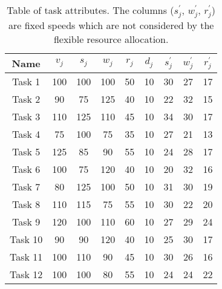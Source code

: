 \begin{table}[h]
    \begin{tabular}{|c|c|c|c|c|c|c|c|c|}
        \hline
        Name    & $v_j$ & $s_j$ & $w_j$ & $r_j$ & $d_j$ & $s^{'}_j$ & $w^{'}_j$ & $r^{'}_j$ \\ [0.5ex] \hline
        Task 1  & 100   & 100   & 100   & 50    & 10    & 30        & 27        & 17        \\ \hline
        Task 2  & 90    & 75    & 125   & 40    & 10    & 22        & 32        & 15        \\ \hline
        Task 3  & 110   & 125   & 110   & 45    & 10    & 34        & 30        & 17        \\ \hline
        Task 4  & 75    & 100   & 75    & 35    & 10    & 27        & 21        & 13        \\ \hline
        Task 5  & 125   & 85    & 90    & 55    & 10    & 24        & 28        & 17        \\ \hline
        Task 6  & 100   & 75    & 120   & 40    & 10    & 20        & 32        & 16        \\ \hline
        Task 7  & 80    & 125   & 100   & 50    & 10    & 31        & 30        & 19        \\ \hline
        Task 8  & 110   & 115   & 75    & 55    & 10    & 30        & 22        & 20        \\ \hline
        Task 9  & 120   & 100   & 110   & 60    & 10    & 27        & 29        & 24        \\ \hline
        Task 10 & 90    & 90    & 120   & 40    & 10    & 25        & 30        & 17        \\ \hline
        Task 11 & 100   & 110   & 90    & 45    & 10    & 30        & 26        & 16        \\ \hline
        Task 12 & 100   & 100   & 80    & 55    & 10    & 24        & 24        & 22        \\ \hline
    \end{tabular}
    \caption{Table of task attributes. The columns ($s^{'}_j$, $w^{'}_j$, $r^{'}_j$) are fixed speeds which are not
    considered by the flexible resource allocation.}
    \label{tab:example-tasks-properties}
\end{table}